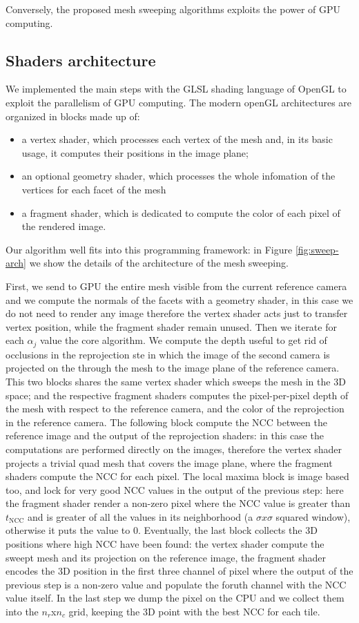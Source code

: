 Conversely, the proposed mesh sweeping algorithms exploits the power of GPU computing. 
\subsection{Shaders architecture}
We implemented the main steps with the GLSL shading language of OpenGL \cite{opengl} to exploit the parallelism of GPU computing.
The modern openGL architectures are organized in blocks made up of:
\begin{itemize}
 \item a vertex shader, which processes each vertex of the mesh and, in its basic usage, it computes their positions in the image plane;
 \item an optional geometry shader, which processes the whole infomation of the vertices for each facet of the mesh
 \item a fragment shader, which is dedicated to compute the color of each pixel of the rendered image.
\end{itemize}
Our algorithm well fits into this programming framework: in Figure \ref{fig:sweep-arch} we show the details of the architecture of the mesh sweeping. 

First, we send to GPU the entire mesh visible from the current reference camera and we compute the normals of the facets with a geometry shader, in this case we do not need to render any image therefore the vertex shader acts just to transfer vertex position, while the fragment shader remain unused.
Then we iterate for each $\alpha_j$ value the core algorithm. 
We compute the depth useful to get rid of occlusions in the reprojection ste in which the image of the second camera is projected on the through the mesh to the image plane of the reference camera. 
This two blocks shares the same vertex shader which sweeps the mesh in the 3D space; and the respective fragment shaders computes the pixel-per-pixel depth of the mesh with respect to the reference camera, and the color of the reprojection in the reference camera.
The following block compute the NCC between the reference image and the output of the reprojection shaders: in this case the computations are performed directly on the images, therefore the vertex shader projects a trivial quad mesh that covers the image plane, where the fragment shaders compute the NCC for each pixel.
The local maxima block is image based too, and lock for very good NCC values in the output of the previous step: here the fragment shader render a non-zero pixel where the NCC value is greater than $t_{\text{NCC}}$ and is greater of all the values in its neighborhood (a $\sigma x \sigma$ squared window), otherwise it puts the value to $0$.
Eventually, the last block collects the 3D positions where high NCC have been found: the vertex shader compute the sweept mesh and its projection on the reference image, the fragment shader encodes the 3D position in the first three channel of pixel where the output of the previous step is a non-zero value and populate the foruth channel with the NCC value itself.
In the last step we dump the pixel on the CPU and we collect them into the $n_r$x$n_c$ grid, keeping the 3D point with the best NCC for each tile.




